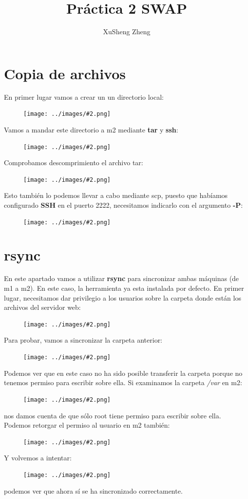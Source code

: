 \documentclass[twoside]{article}
\title{Práctica 2 SWAP}
\author{XuSheng Zheng}
\date{}
\newcommand{\image}[2]{
\begin{figure}[H]
    \texttt{[image: ../images/\#2.png]}
    \centering
\end{figure}
}
\begin{document}
\maketitle
\tableofcontents
\newpage

\section{Copia de archivos}
En primer lugar vamos a crear un un directorio local:
\image{8}{1}
Vamos a mandar este directorio a m2 mediante \textbf{tar} y \textbf{ssh}:
\image{8}{2}
Comprobamos descomprimiento el archivo tar:
\image{8}{3}
Esto también lo podemos llevar a cabo mediante scp, puesto que habíamos configurado \textbf{SSH} en el puerto 2222, necesitamos indicarlo con el argumento \textbf{-P}:
\image{8}{4}

\section{rsync}
En este apartado vamos a utilizar \textbf{rsync} para sincronizar ambas máquinas (de m1 a m2). En este caso, la herramienta ya esta instalada por defecto. En primer lugar, necesitamos dar privilegio a los usuarios sobre la carpeta donde están los archivos del servidor web:
\image{6}{5}
Para probar, vamos a sincronizar la carpeta anterior:
\image{8}{7}
Podemos ver que en este caso no ha sido posible transferir la carpeta porque no tenemos permiso para escribir sobre ella. Si examinamos la carpeta \textit{/var} en m2:
\image{8}{8}
nos damos cuenta de que sólo root tiene permiso para escribir sobre ella. Podemos retorgar el permiso al usuario en m2 también:
\image{6}{6}
Y volvemos a intentar:
\image{8}{9}
podemos ver que ahora sí se ha sincronizado correctamente.
\end{document}
